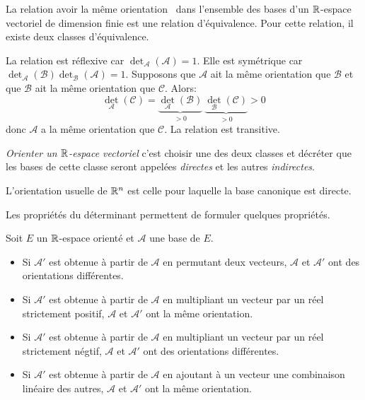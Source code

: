 \begin{propn}
 La relation \og avoir la même orientation\fg~ dans l'ensemble des bases d'un $\mathbb{R}$-espace vectoriel de dimension finie est une relation d'équivalence. Pour cette relation, il existe deux classes d'équivalence.
\end{propn}
\begin{demo}
 La relation est réflexive car $\det_{\mathcal{A}}(\mathcal{A}) = 1$. Elle est symétrique car $\det_{\mathcal{A}}(\mathcal{B}) \det_{\mathcal{B}}(\mathcal{A}) = 1$.\newline
 Supposons que $\mathcal{A}$ ait la même orientation que $\mathcal{B}$ et que $\mathcal{B}$ ait la même orientation que $\mathcal{C}$. Alors:
 \[
  \det_{\mathcal{A}}(\mathcal{C}) = \underset{ > 0}{\underbrace{\det_{\mathcal{A}}(\mathcal{B})}}\:
                                   \underset{ > 0}{\underbrace{\det_{\mathcal{B}}(\mathcal{C})}} > 0
 \]
donc $\mathcal{A}$ a la même orientation que $\mathcal{C}$. La relation est transitive.
\end{demo}
\begin{defi}
\emph{Orienter un $\mathbb{R}$-espace vectoriel} c'est choisir une des deux classes et décréter que les bases de cette classe seront appelées \emph{directes} et les autres \emph{indirectes}.  
\end{defi}
\begin{exple}
 L'orientation usuelle de $\mathbb{R}^n$ est celle pour laquelle la base canonique est directe.
\end{exple}
Les propriétés du déterminant permettent de formuler quelques propriétés.
\begin{propn}
 Soit $E$ un $\mathbb{R}$-espace orienté et $\mathcal{A}$ une base de $E$.
\begin{itemize}
 \item Si $\mathcal{A}'$ est obtenue à partir de $\mathcal{A}$ en permutant deux vecteurs, $\mathcal{A}$ et $\mathcal{A}'$ ont des orientations différentes.
\item Si $\mathcal{A}'$ est obtenue à partir de $\mathcal{A}$ en multipliant un vecteur par un réel strictement positif, $\mathcal{A}$ et $\mathcal{A}'$ ont la même orientation.
\item Si $\mathcal{A}'$ est obtenue à partir de $\mathcal{A}$ en multipliant un vecteur par un réel strictement négtif, $\mathcal{A}$ et $\mathcal{A}'$ ont des orientations différentes.
\item Si $\mathcal{A}'$ est obtenue à partir de $\mathcal{A}$ en ajoutant à un vecteur une combinaison linéaire des autres, $\mathcal{A}$ et $\mathcal{A}'$ ont la même orientation.
\end{itemize}

\end{propn}

